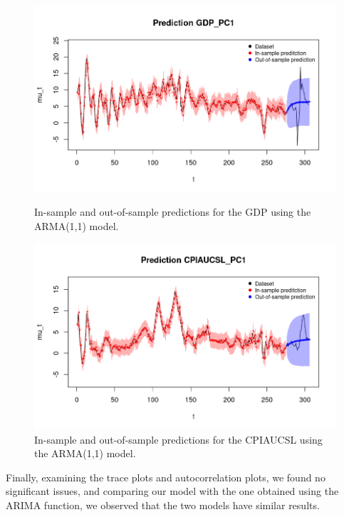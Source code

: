 \begin{figure}[H]
    \centering
    \begin{minipage}{0.5\textwidth}
        \centering
        \includegraphics[width=\textwidth]{images/4-ARMA/gdp_prediction.png}
        \caption{In-sample and out-of-sample predictions for the GDP using the ARMA(1,1) model.}
        \label{fig:ARMA1,1_gdp_prediction}
    \end{minipage}\hfill
    \begin{minipage}{0.5\textwidth}
        \centering
        \includegraphics[width=\textwidth]{images/4-ARMA/infl_prediction.png}
        \caption{In-sample and out-of-sample predictions for the CPIAUCSL using the ARMA(1,1) model.}
        \label{fig:ARMA1,1_infl_prediction}
    \end{minipage}
\end{figure}
Finally, examining the trace plots and autocorrelation plots, we found no significant issues, and comparing our model with the one obtained using the ARIMA function, we observed that the two models have similar results.